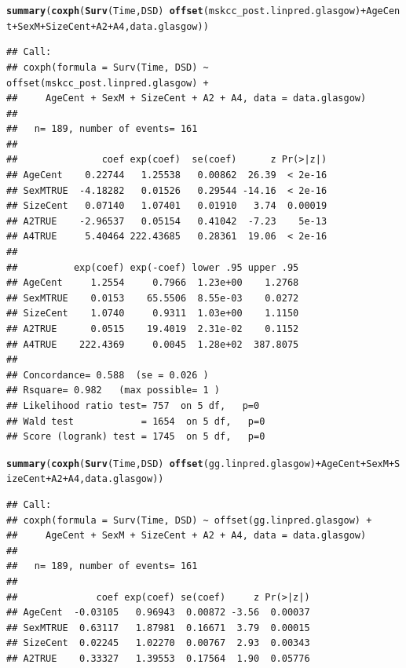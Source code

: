 \documentclass{article}\usepackage[]{graphicx}\usepackage[]{color}
\makeatletter
\newcommand{\hlopt}[1]{\textcolor[rgb]{0,0,0}{#1}}%
\newcommand{\hlstd}[1]{\textcolor[rgb]{0.345,0.345,0.345}{#1}}%
\newcommand{\hlkwd}[1]{\textcolor[rgb]{0.737,0.353,0.396}{\textbf{#1}}}%
\newenvironment{kframe}{%
 \def\at@end@of@kframe{}%
 \ifinner\ifhmode%
  \def\at@end@of@kframe{\end{minipage}}%
  \begin{minipage}{\columnwidth}%
 \fi\fi%
 \def\FrameCommand##1{\hskip\@totalleftmargin \hskip-\fboxsep
 \colorbox{shadecolor}{##1}\hskip-\fboxsep
     \hskip-\linewidth \hskip-\@totalleftmargin \hskip\columnwidth}%
 \MakeFramed {\advance\hsize-\width
   \@totalleftmargin\z@ \linewidth\hsize
   \@setminipage}}%
 {\par\unskip\endMakeFramed%
 \at@end@of@kframe}
\newenvironment{knitrout}{}{} %
\makeatother
\begin{document}
\begin{knitrout}
\begin{kframe}
{\ttfamily\noindent\bfseries\color{errorcolor}{\#\# Error in fitter(X, Y, strats, offset, init, control, weights = weights, : NA/NaN/Inf in foreign function call (arg 6)}}\begin{alltt}
\hlkwd{summary}\hlstd{(}\hlkwd{coxph}\hlstd{(}\hlkwd{Surv}\hlstd{(Time, DSD)} \hlopt{~} \hlkwd{offset}\hlstd{(mskcc_post.linpred.glasgow)} \hlopt{+} \hlstd{AgeCent} \hlopt{+} \hlstd{SexM} \hlopt{+} \hlstd{SizeCent} \hlopt{+} \hlstd{A2} \hlopt{+} \hlstd{A4, data.glasgow))}
\end{alltt}
\begin{verbatim}
## Call:
## coxph(formula = Surv(Time, DSD) ~ offset(mskcc_post.linpred.glasgow) + 
##     AgeCent + SexM + SizeCent + A2 + A4, data = data.glasgow)
## 
##   n= 189, number of events= 161 
## 
##               coef exp(coef)  se(coef)      z Pr(>|z|)
## AgeCent    0.22744   1.25538   0.00862  26.39  < 2e-16
## SexMTRUE  -4.18282   0.01526   0.29544 -14.16  < 2e-16
## SizeCent   0.07140   1.07401   0.01910   3.74  0.00019
## A2TRUE    -2.96537   0.05154   0.41042  -7.23    5e-13
## A4TRUE     5.40464 222.43685   0.28361  19.06  < 2e-16
## 
##          exp(coef) exp(-coef) lower .95 upper .95
## AgeCent     1.2554     0.7966  1.23e+00    1.2768
## SexMTRUE    0.0153    65.5506  8.55e-03    0.0272
## SizeCent    1.0740     0.9311  1.03e+00    1.1150
## A2TRUE      0.0515    19.4019  2.31e-02    0.1152
## A4TRUE    222.4369     0.0045  1.28e+02  387.8075
## 
## Concordance= 0.588  (se = 0.026 )
## Rsquare= 0.982   (max possible= 1 )
## Likelihood ratio test= 757  on 5 df,   p=0
## Wald test            = 1654  on 5 df,   p=0
## Score (logrank) test = 1745  on 5 df,   p=0
\end{verbatim}
\begin{alltt}
\hlkwd{summary}\hlstd{(}\hlkwd{coxph}\hlstd{(}\hlkwd{Surv}\hlstd{(Time, DSD)} \hlopt{~} \hlkwd{offset}\hlstd{(gg.linpred.glasgow)} \hlopt{+} \hlstd{AgeCent} \hlopt{+} \hlstd{SexM} \hlopt{+} \hlstd{SizeCent} \hlopt{+} \hlstd{A2} \hlopt{+} \hlstd{A4, data.glasgow))}
\end{alltt}
\begin{verbatim}
## Call:
## coxph(formula = Surv(Time, DSD) ~ offset(gg.linpred.glasgow) + 
##     AgeCent + SexM + SizeCent + A2 + A4, data = data.glasgow)
## 
##   n= 189, number of events= 161 
## 
##              coef exp(coef) se(coef)     z Pr(>|z|)
## AgeCent  -0.03105   0.96943  0.00872 -3.56  0.00037
## SexMTRUE  0.63117   1.87981  0.16671  3.79  0.00015
## SizeCent  0.02245   1.02270  0.00767  2.93  0.00343
## A2TRUE    0.33327   1.39553  0.17564  1.90  0.05776

\end{verbatim}
\end{kframe}
\end{knitrout}
\end{document}
